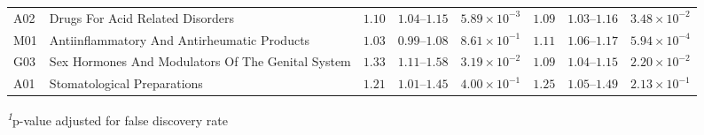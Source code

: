 \begin{longtable}{llrrrrrr}
A02 & Drugs For Acid Related Disorders & $1.10$ & $1.04$–$1.15$ & $5.89 \times 10^{-3}$ & $1.09$ & $1.03$–$1.16$ & $3.48 \times 10^{-2}$ \\ 
M01 & Antiinflammatory And Antirheumatic Products & $1.03$ & $0.99$–$1.08$ & $8.61 \times 10^{-1}$ & $1.11$ & $1.06$–$1.17$ & $5.94 \times 10^{-4}$ \\ 
G03 & Sex Hormones And Modulators Of The Genital System & $1.33$ & $1.11$–$1.58$ & $3.19 \times 10^{-2}$ & $1.09$ & $1.04$–$1.15$ & $2.20 \times 10^{-2}$ \\ 
A01 & Stomatological Preparations & $1.21$ & $1.01$–$1.45$ & $4.00 \times 10^{-1}$ & $1.25$ & $1.05$–$1.49$ & $2.13 \times 10^{-1}$ \\ 
\bottomrule
\end{longtable}
\begin{minipage}{\linewidth}
\textsuperscript{\textit{1}}p-value adjusted for false discovery rate\\
\end{minipage}


